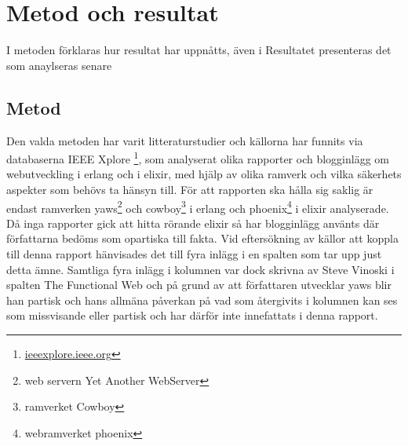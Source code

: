 \documentclass[12pt]{article}
\begin{document}
\section{Metod och 	resultat }	



I metoden förklaras hur resultat har uppnåtts, 
även i Resultatet presenteras det som anaylseras senare 



\subsection{ Metod}

Den valda metoden har varit litteraturstudier och källorna har funnits via databaserna IEEE Xplore  \footnote{ \url{ieeexplore.ieee.org}},  som analyserat olika rapporter och blogginlägg om webutveckling i erlang och i elixir, med hjälp av olika ramverk och vilka säkerhets aspekter som behövs ta hänsyn till.
För att rapporten ska hålla sig saklig är endast ramverken yaws\footnote{web servern Yet Another WebServer\cite{yawsorg}} och cowboy\footnote{ramverket Cowboy\cite{cowboyorg}} i erlang och phoenix\footnote{webramverket phoenix\cite{phoenixorg}} i elixir analyserade.
Då inga rapporter gick att hitta rörande elixir så har blogginlägg använts där författarna bedöms som opartiska till fakta.
Vid eftersökning av källor att koppla till denna rapport hänvisades det till fyra inlägg i en spalten som tar upp just detta ämne.
Samtliga fyra inlägg i kolumnen var dock skrivna av Steve Vinoski i spalten The Functional Web och på grund av att författaren utvecklar yaws blir han partisk och hans allmäna påverkan på vad som återgivits i kolumnen kan ses som missvisande eller partisk och har därför inte innefattats i denna rapport.
\end{document}
